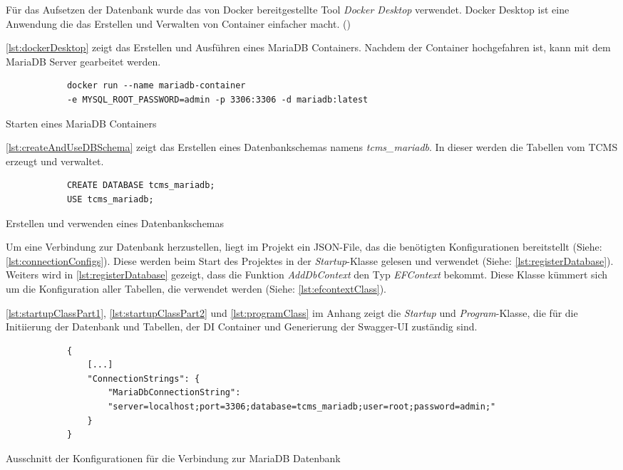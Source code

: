 \documentclass[a4paper, fontsize=11pt, parskip=half, twoside]{scrreprt}
\begin{document}
	Für das Aufsetzen der Datenbank wurde das von Docker bereitgestellte Tool \emph{Docker Desktop} verwendet.
	Docker Desktop ist eine Anwendung die das Erstellen und Verwalten von Container einfacher macht. (\textcite{noauthor_docker_2022})
	
	\autoref{lst:dockerDesktop} zeigt das Erstellen und Ausführen eines MariaDB Containers.
	Nachdem der Container hochgefahren ist, kann mit dem MariaDB Server gearbeitet werden.
	
	\begin{listing}[ht]
		\begin{verbatim}
			docker run --name mariadb-container 
			-e MYSQL_ROOT_PASSWORD=admin -p 3306:3306 -d mariadb:latest
		\end{verbatim}
		\caption{Starten eines MariaDB Containers}
		\label{lst:dockerDesktop}
	\end{listing}

	\autoref{lst:createAndUseDBSchema} zeigt das Erstellen eines Datenbankschemas namens \emph{tcms\_mariadb}. 
	In dieser werden die Tabellen vom \ac{TCMS} erzeugt und verwaltet.
	
	\begin{listing}[ht]
		\begin{verbatim}
			CREATE DATABASE tcms_mariadb; 
			USE tcms_mariadb;
		\end{verbatim}
		\caption{Erstellen und verwenden eines Datenbankschemas}
		\label{lst:createAndUseDBSchema}
	\end{listing}

	Um eine Verbindung zur Datenbank herzustellen, liegt im Projekt ein \ac{JSON}-File, das die benötigten Konfigurationen bereitstellt (Siehe: \autoref{lst:connectionConfigs}).
	Diese werden beim Start des Projektes in der \emph{Startup}-Klasse gelesen und verwendet (Siehe: \autoref{lst:registerDatabase}).
	Weiters wird in \autoref{lst:registerDatabase} gezeigt, dass die Funktion \emph{AddDbContext} den Typ \emph{EFContext} bekommt. 
	Diese Klasse kümmert sich um die Konfiguration aller Tabellen, die verwendet werden (Siehe: \autoref{lst:efcontextClass}).

	\autoref{lst:startupClassPart1}, \ref{lst:startupClassPart2} und \ref{lst:programClass} im Anhang zeigt die \emph{Startup} und \emph{Program}-Klasse, die für die Initiierung der Datenbank und Tabellen, der \ac{DI} Container und Generierung der Swagger-UI zuständig sind.

	\begin{listing}[ht]
		\begin{verbatim}
			{
				[...]		
				"ConnectionStrings": {
					"MariaDbConnectionString": 
					"server=localhost;port=3306;database=tcms_mariadb;user=root;password=admin;"
				}
			}
		\end{verbatim}
		\caption{Ausschnitt der Konfigurationen für die Verbindung zur MariaDB Datenbank}
		\label{lst:connectionConfigs}
	\end{listing}
\end{document}
